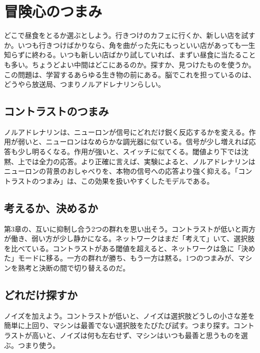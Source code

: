 \chapter{冒険心のつまみ}

どこで昼食をとるか選ぶとしよう。行きつけのカフェに行くか、新しい店を試すか。いつも行きつけばかりなら、角を曲がった先にもっといい店があっても一生知らずに終わる。いつも新しい店ばかり試していれば、まずい昼食に当たることも多い。ちょうどよい中間はどこにあるのか。探すか、見つけたものを使うか。この問題は、学習するあらゆる生き物の前にある。脳でこれを担っているのは、どうやら放送局、つまりノルアドレナリンらしい。

\section*{コントラストのつまみ}

ノルアドレナリンは、ニューロンが信号にどれだけ鋭く反応するかを変える。作用が弱いと、ニューロンはなめらかな調光器に似ている。信号が少し増えれば応答も少し明るくなる。作用が強いと、スイッチに似てくる。閾値より下では沈黙、上では全力の応答。より正確に言えば、実験によると、ノルアドレナリンはニューロンの背景のおしゃべりを、本物の信号への応答より強く抑える。「コントラストのつまみ」は、この効果を扱いやすくしたモデルである。


\section*{考えるか、決めるか}

第3章の、互いに抑制し合う2つの群れを思い出そう。コントラストが低いと両方が働き、弱い方が少し静かになる。ネットワークはまだ「考えて」いて、選択肢を比べている。コントラストがある閾値を超えると、ネットワークは急に「決めた」モードに移る。一方の群れが勝ち、もう一方は黙る。1つのつまみが、マシンを熟考と決断の間で切り替えるのだ。

\section*{どれだけ探すか}

ノイズを加えよう。コントラストが低いと、ノイズは選択肢どうしの小さな差を簡単に上回り、マシンは最善でない選択肢をたびたび試す。つまり探す。コントラストが高いと、ノイズは何も左右せず、マシンはいつも最善と思うものを選ぶ。つまり使う。

